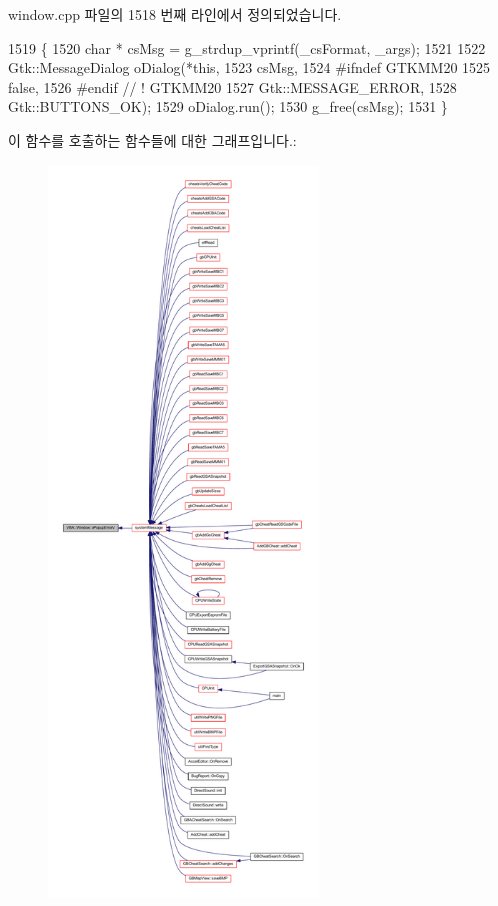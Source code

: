 window.\+cpp 파일의 1518 번째 라인에서 정의되었습니다.


\begin{DoxyCode}
1519 \{
1520   \textcolor{keywordtype}{char} * csMsg = g\_strdup\_vprintf(\_csFormat, \_args);
1521 
1522   Gtk::MessageDialog oDialog(*\textcolor{keyword}{this},
1523                              csMsg,
1524 #ifndef GTKMM20
1525                              \textcolor{keyword}{false},
1526 #endif \textcolor{comment}{// ! GTKMM20}
1527                              Gtk::MESSAGE\_ERROR,
1528                              Gtk::BUTTONS\_OK);
1529   oDialog.run();
1530   g\_free(csMsg);
1531 \}
\end{DoxyCode}
이 함수를 호출하는 함수들에 대한 그래프입니다.\+:
\nopagebreak
\begin{figure}[H]
\begin{center}
\leavevmode
\includegraphics[height=550pt]{class_v_b_a_1_1_window_a1f89a108839ea022393c56782dde0f60_icgraph}
\end{center}
\end{figure}
\mbox{\label{class_v_b_a_1_1_window_acf7f6aac9ae790353c5c61e7afa3515e}} 
